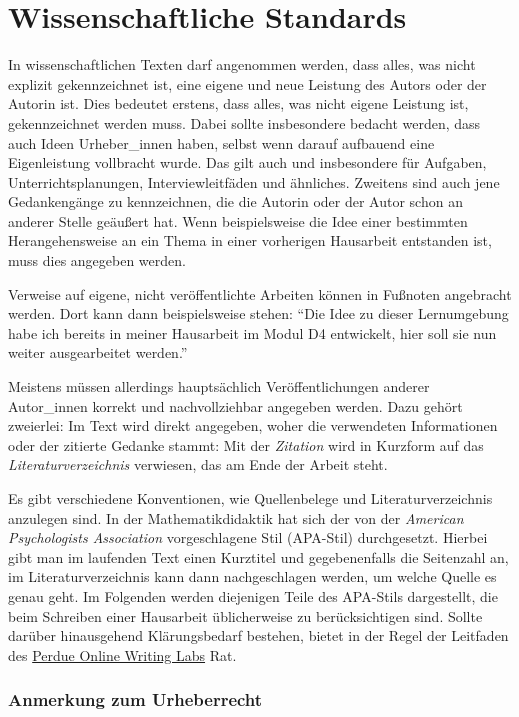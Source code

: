 \documentclass[ngerman,bibliography=totoc,oneside,12pt,a4paper]{scrbook}
\begin{document}
\chapter{Wissenschaftliche Standards}\label{wissenschaftliche-standards}

In wissenschaftlichen Texten darf angenommen werden, dass alles, was
nicht explizit gekennzeichnet ist, eine eigene und neue Leistung des
Autors oder der Autorin ist. Dies bedeutet erstens, dass alles, was
nicht eigene Leistung ist, gekennzeichnet werden muss. Dabei sollte
insbesondere bedacht werden, dass auch Ideen Urheber\_innen haben,
selbst wenn darauf aufbauend eine Eigenleistung vollbracht wurde. Das
gilt auch und insbesondere für Aufgaben, Unterrichtsplanungen,
Interviewleitfäden und ähnliches. Zweitens sind auch jene Gedankengänge
zu kennzeichnen, die die Autorin oder der Autor schon an anderer Stelle
geäußert hat. Wenn beispielsweise die Idee einer bestimmten
Herangehensweise an ein Thema in einer vorherigen Hausarbeit entstanden
ist, muss dies angegeben werden.

Verweise auf eigene, nicht veröffentlichte Arbeiten können in Fußnoten
angebracht werden. Dort kann dann beispielsweise stehen: \enquote{Die
Idee zu dieser Lernumgebung habe ich bereits in meiner Hausarbeit im
Modul D4 entwickelt, hier soll sie nun weiter ausgearbeitet werden.}

Meistens müssen allerdings hauptsächlich Veröffentlichungen anderer
Autor\_innen korrekt und nachvollziehbar angegeben werden. Dazu gehört
zweierlei: Im Text wird direkt angegeben, woher die verwendeten
Informationen oder der zitierte Gedanke stammt: Mit der \emph{Zitation}
wird in Kurzform auf das \emph{Literaturverzeichnis} verwiesen, das am
Ende der Arbeit steht.

Es gibt verschiedene Konventionen, wie Quellenbelege und
Literaturverzeichnis anzulegen sind. In der Mathematikdidaktik hat sich
der von der \emph{American Psychologists Association} vorgeschlagene
Stil (APA-Stil) durchgesetzt. Hierbei gibt man im laufenden Text einen
Kurztitel und gegebenenfalls die Seitenzahl an, im Literaturverzeichnis
kann dann nachgeschlagen werden, um welche Quelle es genau geht. Im
Folgenden werden diejenigen Teile des APA-Stils dargestellt, die beim
Schreiben einer Hausarbeit üblicherweise zu berücksichtigen sind. Sollte
darüber hinausgehend Klärungsbedarf bestehen, bietet in der Regel der
Leitfaden des
\href{http://owl.english.purdue.edu/owl/section/2/10/}{Perdue Online
Writing Labs} Rat.

\subsection*{Anmerkung zum
Urheberrecht}\label{anmerkung-zum-urheberrecht}
\end{document}
